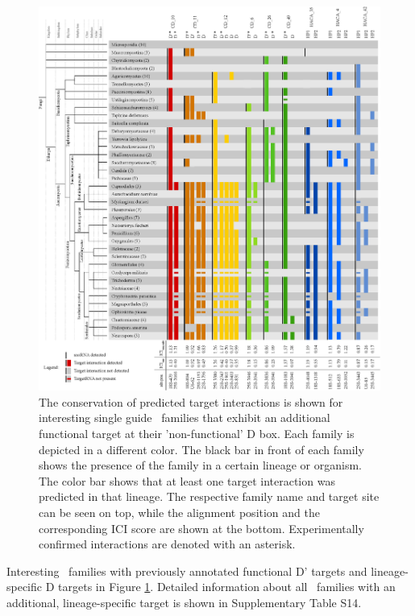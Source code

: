 \begin{figure}
  \centering
  \includegraphics[width=\textwidth]{pics/conservation_lineage_specific_targets.eps}
  \caption{The conservation of predicted target interactions is shown for
    interesting single guide \cd\ families that exhibit an additional
    functional target at their 'non-functional' D box. Each family is
    depicted in a different color. The black bar in front of each family
    shows the presence of the family in a certain lineage or organism. The
    color bar shows that at least one target interaction was predicted in
    that lineage. The respective family name and target site can be seen on
    top, while the alignment position and the corresponding ICI score are
    shown at the bottom. Experimentally confirmed interactions are denoted
    with an asterisk.}
  \label{fig:additional_targets}
\end{figure}

Interesting \cd\ families with previously annotated functional D' targets
and lineage-specific D targets  in Figure
\ref{fig:additional_targets}. Detailed information about all \sno\ families
with an additional, lineage-specific target is shown in Supplementary Table
S14.

